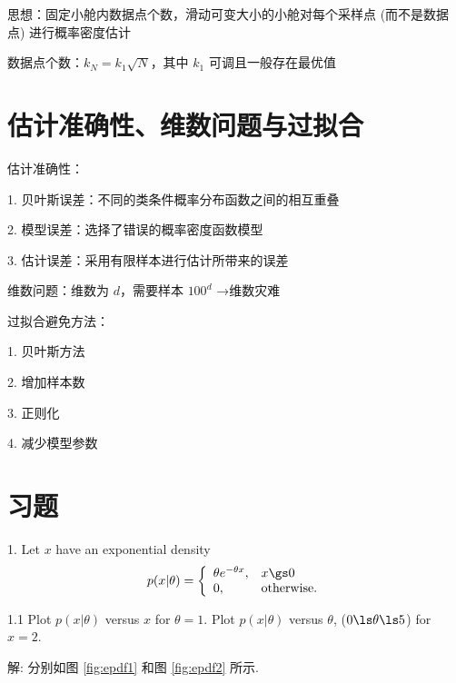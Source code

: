 \documentclass[openany]{ctexbook}
\theoremstyle{kaiti}
\theoremstyle{normal}
\begin{document}
思想：固定小舱内数据点个数，滑动可变大小的小舱对每个采样点 (而不是数据点) 进行概率密度估计

数据点个数：$k_N=k_1\sqrt{N}$，其中 $k_1$ 可调且一般存在最优值

\section{估计准确性、维数问题与过拟合}

估计准确性：

1. 贝叶斯误差：不同的类条件概率分布函数之间的相互重叠

2. 模型误差：选择了错误的概率密度函数模型

3. 估计误差：采用有限样本进行估计所带来的误差

维数问题：维数为 $d$，需要样本 $100^d$ →维数灾难

过拟合避免方法：

1. 贝叶斯方法

2. 增加样本数

3. 正则化

4. 减少模型参数

\section{习题}

1. Let $x$ have an exponential density
\begin{equation}
  p(x|\theta)=
  \left\{
    \begin{array}{ll}
      \theta e^{-\theta x}, & x \gs 0 \\
      0,                    & \text {otherwise.}
    \end{array}
  \right.
\end{equation}

1.1 Plot $p(x|\theta)$ versus $x$ for $\theta = 1$. Plot $p(x|\theta)$ versus $\theta$, ($0 \ls \theta \ls 5$) for $x = 2$.

解: 分别如图 \ref{fig:epdf1} 和图 \ref{fig:epdf2} 所示.
\end{document}
